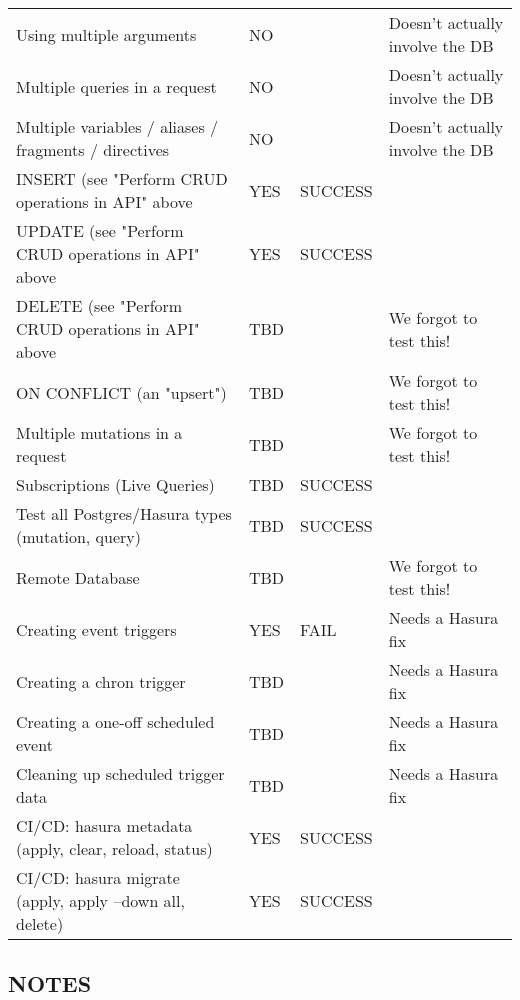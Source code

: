 \documentclass[11pt]{article}
\begin{document}
\begin{center}
\begin{tabular}{llll}
Using multiple arguments & NO &  & Doesn't actually involve the DB\\
Multiple queries in a request & NO &  & Doesn't actually involve the DB\\
Multiple variables / aliases / fragments / directives & NO &  & Doesn't actually involve the DB\\
INSERT (see "Perform CRUD operations in API" above & YES & SUCCESS & \\
UPDATE (see "Perform CRUD operations in API" above & YES & SUCCESS & \\
DELETE (see "Perform CRUD operations in API" above & TBD &  & We forgot to test this!\\
ON CONFLICT (an "upsert") & TBD &  & We forgot to test this!\\
Multiple mutations in a request & TBD &  & We forgot to test this!\\
Subscriptions (Live Queries) & TBD & SUCCESS & \\
Test all Postgres/Hasura types (mutation, query) & TBD & SUCCESS & \\
Remote Database & TBD &  & We forgot to test this!\\
Creating event triggers & YES & FAIL & Needs a Hasura fix\\
Creating a chron trigger & TBD &  & Needs a Hasura fix\\
Creating a one-off scheduled event & TBD &  & Needs a Hasura fix\\
Cleaning up scheduled trigger data & TBD &  & Needs a Hasura fix\\
CI/CD: hasura metadata (apply, clear, reload, status) & YES & SUCCESS & \\
CI/CD: hasura migrate (apply, apply --down all, delete) & YES & SUCCESS & \\
\end{tabular}
\end{center}

\subsection{NOTES}
\label{sec:org406a1c5}
\end{document}
